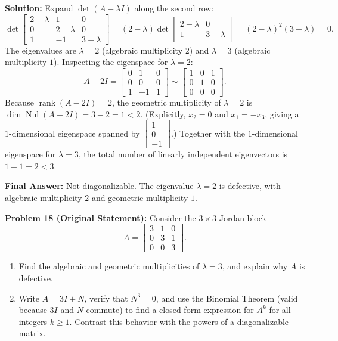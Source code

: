\documentclass[11pt, letterpaper]{article}
\theoremstyle{definition}
\theoremstyle{remark}
\begin{document}
\textbf{Solution:}
Expand $\det(A - \lambda I)$ along the second row:
\[
\det\begin{bmatrix} 2 - \lambda & 1 & 0 \\ 0 & 2 - \lambda & 0 \\ 1 & -1 & 3 - \lambda \end{bmatrix} = (2 - \lambda)\det\begin{bmatrix} 2 - \lambda & 0 \\ 1 & 3 - \lambda \end{bmatrix} = (2 - \lambda)^{2}(3 - \lambda) = 0.
\]
The eigenvalues are $\lambda = 2$ (algebraic multiplicity $2$) and $\lambda = 3$ (algebraic multiplicity $1$). Inspecting the eigenspace for $\lambda = 2$:
\[
A - 2I = \begin{bmatrix} 0 & 1 & 0 \\ 0 & 0 & 0 \\ 1 & -1 & 1 \end{bmatrix} \sim \begin{bmatrix} 1 & 0 & 1 \\ 0 & 1 & 0 \\ 0 & 0 & 0 \end{bmatrix}.
\]
Because $\operatorname{rank}(A - 2I) = 2$, the geometric multiplicity of $\lambda = 2$ is $\dim\operatorname{Nul}(A - 2I) = 3 - 2 = 1 < 2$. (Explicitly, $x_{2} = 0$ and $x_{1} = -x_{3}$, giving a $1$-dimensional eigenspace spanned by $\begin{bmatrix} 1 \\ 0 \\ -1 \end{bmatrix}$.) Together with the $1$-dimensional eigenspace for $\lambda = 3$, the total number of linearly independent eigenvectors is $1 + 1 = 2 < 3$.

\textbf{Final Answer:} Not diagonalizable. The eigenvalue $\lambda = 2$ is defective, with algebraic multiplicity $2$ and geometric multiplicity $1$.

\vspace{0.8em}
\textbf{Problem 18 (Original Statement):}
Consider the $3 \times 3$ Jordan block
\[
A = \begin{bmatrix} 3 & 1 & 0 \\ 0 & 3 & 1 \\ 0 & 0 & 3 \end{bmatrix}.
\]
\begin{enumerate}[label=(\alph*)]
    \item Find the algebraic and geometric multiplicities of $\lambda = 3$, and explain why $A$ is defective.
    \item Write $A = 3I + N$, verify that $N^{3} = 0$, and use the Binomial Theorem (valid because $3I$ and $N$ commute) to find a closed-form expression for $A^{k}$ for all integers $k \ge 1$. Contrast this behavior with the powers of a diagonalizable matrix.
\end{enumerate}
\end{document}
